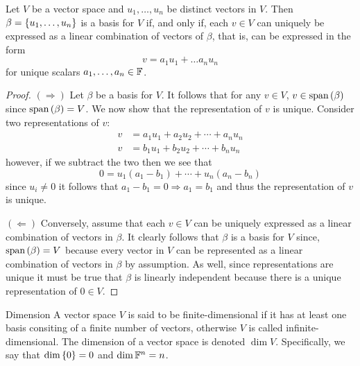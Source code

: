\documentclass{exam}
\begin{document}
    \begin{thm}{}
        Let $V$ be a vector space and $u_1, \dots, u_n$ be distinct vectors in $V$. Then $\beta = \left\{u_1, \dots, u_n \right\}$ is a basis for $V$ if, and only if, each $v \in V$ can uniquely be expressed as a linear combination of vectors of $\beta$, that is, can be expressed in the form 
        \[
            v = a_1 u_1 + \dots a_n u_n
        \]
        for unique scalars $a_1, \dots, a_n \in \mathbb F$.
        \begin{proof}
            $(\Rightarrow)$ Let $\beta$ be a basis for $V$. It follows that for any $v \in V$, $v \in \text{span}\left({\beta}\right)$ since $\text{span}\left({\beta}\right) = V$. We now show that the representation of $v$ is unique. Consider two representations of $v$: 
            \begin{align*}
                v &= a_1 u_1 + a_2 u_2 + \cdots + a_n u_n \\
                v &= b_1 u_1 + b_2 u_2 + \cdots + b_n u_n
            \end{align*}
            however, if we subtract the two then we see that 
            \[
                0 = u_1(a_1 - b_1) + \cdots + u_n(a_n - b_n)
            \]
            since $u_i \neq 0$ it follows that $a_1 - b_1 = 0 \Rightarrow a_1 = b_1$ and thus the representation of $v$ is unique.

            $(\Leftarrow)$ Conversely, assume that each $v \in V$ can be uniquely expressed as a linear combination of vectors in $\beta$. It clearly follows that $\beta$ is a basis for $V$ since, $\text{span}\left({\beta}\right) = V$ because every vector in $V$ can be represented as a linear combination of vectors in $\beta$ by assumption. As well, since representations are unique it must be true that $\beta$ is linearly independent because there is a unique representation of $0 \in V$.
        \end{proof}
    \end{thm}

    \begin{defbox}{Dimension}
        A vector space $V$ is said to be finite-dimensional if it has at least one basis consiting of a finite number of vectors, otherwise $V$ is called infinite-dimensional. The dimension of a vector space is denoted $\dim V$. Specifically, we say that $\dim \left\{0 \right\} = 0$ and $\dim \mathbb F^n = n$.
    \end{defbox}
\end{document}
